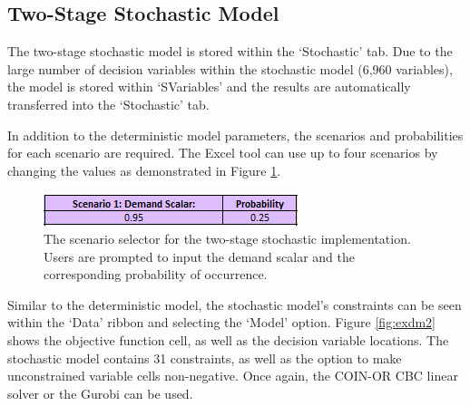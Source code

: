 \documentclass[../thesis.tex]{subfiles}
\begin{document}
\subsection{Two-Stage Stochastic Model}
The two-stage stochastic model is stored within the `Stochastic' tab. Due to the large number of decision variables within the stochastic model (6,960 variables), the model is stored within `SVariables' and the results are automatically transferred into the `Stochastic' tab.

In addition to the deterministic model parameters, the scenarios and probabilities for each scenario are required. The Excel tool can use up to four scenarios by changing the values as demonstrated in Figure \ref{fig:exscen}.
\begin{figure}[h!]
    \centering
    \includegraphics{Chapters/Chapter7/Figures/scenarios.png}
    \caption{The scenario selector for the two-stage stochastic implementation. Users are prompted to input the demand scalar and the corresponding probability of occurrence.}
    \label{fig:exscen}
\end{figure}

Similar to the deterministic model, the stochastic model's constraints can be seen within the `Data' ribbon and selecting the `Model' option. Figure \ref{fig:exdm2} shows the objective function cell, as well as the decision variable locations. The stochastic model contains 31 constraints, as well as the option to make unconstrained variable cells non-negative. Once again, the COIN-OR CBC linear solver or the Gurobi can be used.
\end{document}
